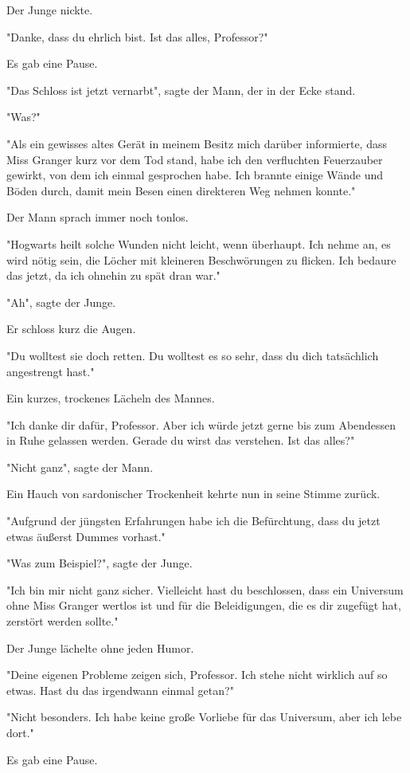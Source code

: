 {Der Junge nickte.

"Danke, dass du ehrlich bist. Ist das alles, Professor?"

Es gab eine Pause.

"Das Schloss ist jetzt vernarbt", sagte der Mann, der in der Ecke stand.

"Was?"

"Als ein gewisses altes Gerät in meinem Besitz mich darüber informierte, dass Miss Granger kurz vor dem Tod stand, habe ich den verfluchten Feuerzauber gewirkt, von dem ich einmal gesprochen habe. Ich brannte einige Wände und Böden durch, damit mein Besen einen direkteren Weg nehmen konnte."

Der Mann sprach immer noch tonlos.

"Hogwarts heilt solche Wunden nicht leicht, wenn überhaupt. Ich nehme an, es wird nötig sein, die Löcher mit kleineren Beschwörungen zu flicken. Ich bedaure das jetzt, da ich ohnehin zu spät dran war."

"Ah", sagte der Junge.

Er schloss kurz die Augen.

"Du wolltest sie doch retten. Du wolltest es so sehr, dass du dich tatsächlich angestrengt hast."

Ein kurzes, trockenes Lächeln des Mannes.

"Ich danke dir dafür, Professor. Aber ich würde jetzt gerne bis zum Abendessen in Ruhe gelassen werden. Gerade du wirst das verstehen. Ist das alles?"

"Nicht ganz", sagte der Mann.

Ein Hauch von sardonischer Trockenheit kehrte nun in seine Stimme zurück.

"Aufgrund der jüngsten Erfahrungen habe ich die Befürchtung, dass du jetzt etwas äußerst Dummes vorhast."

"Was zum Beispiel?", sagte der Junge.

"Ich bin mir nicht ganz sicher. Vielleicht hast du beschlossen, dass ein Universum ohne Miss Granger wertlos ist und für die Beleidigungen, die es dir zugefügt hat, zerstört werden sollte."

Der Junge lächelte ohne jeden Humor.

"Deine eigenen Probleme zeigen sich, Professor. Ich stehe nicht wirklich auf so etwas. Hast du das irgendwann einmal getan?"

"Nicht besonders. Ich habe keine große Vorliebe für das Universum, aber ich lebe dort."

Es gab eine Pause.

}
